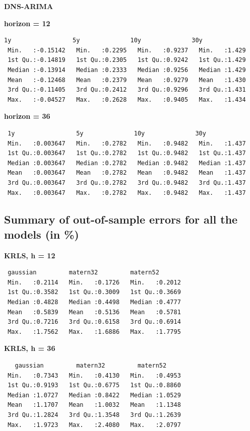 \textbf{DNS-ARIMA}

\textbf{horizon = 12}
\begin{verbatim}
1y                 5y              10y              30y       
 Min.   :-0.15142   Min.   :0.2295   Min.   :0.9237   Min.   :1.429  
 1st Qu.:-0.14819   1st Qu.:0.2305   1st Qu.:0.9242   1st Qu.:1.429  
 Median :-0.13914   Median :0.2333   Median :0.9256   Median :1.429  
 Mean   :-0.12468   Mean   :0.2379   Mean   :0.9279   Mean   :1.430  
 3rd Qu.:-0.11405   3rd Qu.:0.2412   3rd Qu.:0.9296   3rd Qu.:1.431  
 Max.   :-0.04527   Max.   :0.2628   Max.   :0.9405   Max.   :1.434 
\end{verbatim}

\textbf{horizon = 36}
\begin{verbatim}
 1y                 5y              10y              30y       
 Min.   :0.003647   Min.   :0.2782   Min.   :0.9482   Min.   :1.437  
 1st Qu.:0.003647   1st Qu.:0.2782   1st Qu.:0.9482   1st Qu.:1.437  
 Median :0.003647   Median :0.2782   Median :0.9482   Median :1.437  
 Mean   :0.003647   Mean   :0.2782   Mean   :0.9482   Mean   :1.437  
 3rd Qu.:0.003647   3rd Qu.:0.2782   3rd Qu.:0.9482   3rd Qu.:1.437  
 Max.   :0.003647   Max.   :0.2782   Max.   :0.9482   Max.   :1.437
\end{verbatim}

\subsection{Summary of out-of-sample errors for all the models (in \%)}

\textbf{KRLS, h = 12}

\begin{verbatim}
 gaussian         matern32         matern52     
 Min.   :0.2114   Min.   :0.1726   Min.   :0.2012  
 1st Qu.:0.3582   1st Qu.:0.3009   1st Qu.:0.3669  
 Median :0.4828   Median :0.4498   Median :0.4777  
 Mean   :0.5839   Mean   :0.5136   Mean   :0.5781  
 3rd Qu.:0.7216   3rd Qu.:0.6158   3rd Qu.:0.6914  
 Max.   :1.7562   Max.   :1.6886   Max.   :1.7795  
\end{verbatim}

\textbf{KRLS, h = 36}

\begin{verbatim}
   gaussian         matern32         matern52     
 Min.   :0.7343   Min.   :0.4130   Min.   :0.4953  
 1st Qu.:0.9193   1st Qu.:0.6775   1st Qu.:0.8860  
 Median :1.0727   Median :0.8422   Median :1.0529  
 Mean   :1.1707   Mean   :1.0032   Mean   :1.1348  
 3rd Qu.:1.2824   3rd Qu.:1.3548   3rd Qu.:1.2639  
 Max.   :1.9723   Max.   :2.4080   Max.   :2.0797 
\end{verbatim}

